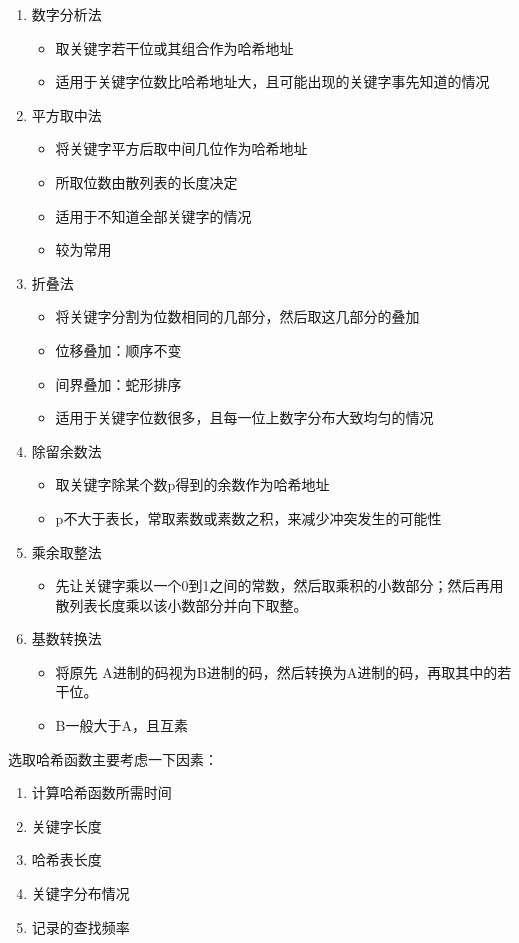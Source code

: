 \documentclass[a4paper,11pt]{article}%
\begin{document}
\begin{enumerate}
 \item 数字分析法
 \begin{itemize}
    \item 取关键字若干位或其组合作为哈希地址
    \item 适用于关键字位数比哈希地址大，且可能出现的关键字事先知道的情况
 \end{itemize}
 \item 平方取中法
 \begin{itemize}
    \item 将关键字平方后取中间几位作为哈希地址
    \item 所取位数由散列表的长度决定
    \item 适用于不知道全部关键字的情况
    \item  较为常用
 \end{itemize}
 \item 折叠法
 \begin{itemize}
    \item 将关键字分割为位数相同的几部分，然后取这几部分的叠加
    \item 位移叠加：顺序不变
    \item  间界叠加：蛇形排序
    \item 适用于关键字位数很多，且每一位上数字分布大致均匀的情况
 \end{itemize}
 \item 除留余数法
 \begin{itemize}
    \item 取关键字除某个数p得到的余数作为哈希地址
    \item p不大于表长，常取素数或素数之积，来减少冲突发生的可能性
 \end{itemize}
 \item 乘余取整法
 \begin{itemize}
    \item 先让关键字乘以一个0到1之间的常数，然后取乘积的小数部分；然后再用散列表长度乘以该小数部分并向下取整。
 \end{itemize}
 \item 基数转换法
 \begin{itemize}
    \item 将原先 A进制的码视为B进制的码，然后转换为A进制的码，再取其中的若干位。
    \item B一般大于A，且互素 
 \end{itemize}
\end{enumerate}

选取哈希函数主要考虑一下因素：
\begin{enumerate}
    \item 计算哈希函数所需时间
\item 关键字长度
\item  哈希表长度
\item  关键字分布情况
\item 记录的查找频率
\end{enumerate}
\end{document}
